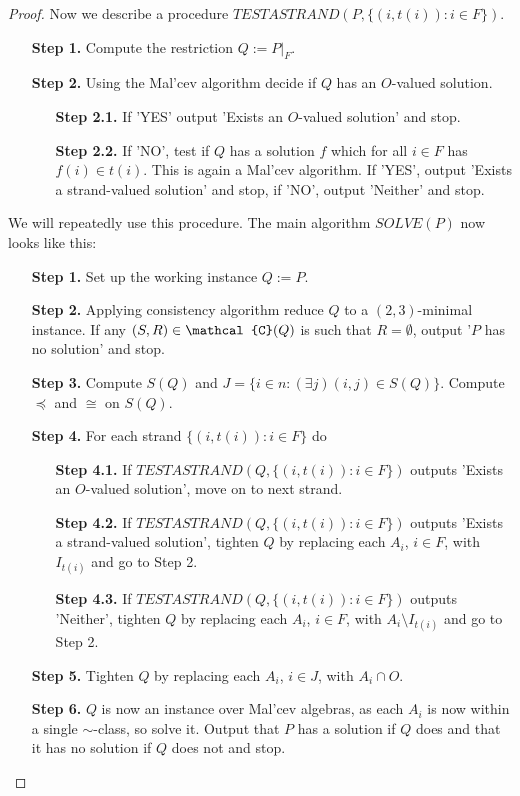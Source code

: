 \documentclass[11pt]{amsart}
\newcommand{\vr}[1]{{\uppercase {\mathcal{#1}}}}
\theoremstyle{definition}
\begin{document}
\begin{proof}
Now we describe a procedure $TESTASTRAND(P,\{(i,t(i)):i\in F\})$.

\begin{enumerate}
\item[{\bf Step 1.}] Compute the restriction $Q:=P|_F$.
\item[{\bf Step 2.}] Using the Mal'cev algorithm decide if $Q$ has an $O$-valued solution.
\begin{enumerate}
\item[{\bf Step 2.1.}] If 'YES' output 'Exists an $O$-valued solution' and stop.
\item[{\bf Step 2.2.}] If 'NO', test if $Q$ has a solution $f$ which for all $i\in F$ has $f(i)\in t(i)$. This is again a Mal'cev algorithm. If 'YES', output 'Exists a strand-valued solution' and stop, if 'NO', output 'Neither' and stop.
\end{enumerate}
\end{enumerate}

We will repeatedly use this procedure. The main algorithm $SOLVE(P)$ now looks like this:

\begin{enumerate}
\item[{\bf Step 1.}] Set up the working instance $Q:=P$.
\item[{\bf Step 2.}] Applying consistency algorithm reduce $Q$ to a $(2,3)$-minimal instance. If any $(S,R)\in\vr c(Q)$ is such that $R=\emptyset$, output '$P$ has no solution' and stop.
\item[{\bf Step 3.}] Compute $S(Q)$ and $J=\{i\in n:(\exists j)(i,j)\in S(Q)\}$. Compute $\preceq$ and $\cong$ on $S(Q)$.
\item[{\bf Step 4.}] For each strand $\{(i,t(i)):i\in F\}$ do
\begin{enumerate}
\item[{\bf Step 4.1.}] If $TESTASTRAND(Q,\{(i,t(i)):i\in F\})$ outputs 'Exists an $O$-valued solution', move on to next strand.
\item[{\bf Step 4.2.}] If  $TESTASTRAND(Q,\{(i,t(i)):i\in F\})$ outputs 'Exists a strand-valued solution', tighten $Q$ by replacing each $A_i$, $i\in F$, with $I_{t(i)}$ and go to Step 2.
\item[{\bf Step 4.3.}] If $TESTASTRAND(Q,\{(i,t(i)):i\in F\})$ outputs 'Neither', tighten $Q$ by replacing each $A_i$, $i\in F$, with  $A_i\setminus I_{t(i)}$ and go to Step 2.
\end{enumerate}
\item[{\bf Step 5.}] Tighten $Q$ by replacing each $A_i$, $i\in J$, with  $A_i\cap O$.
\item[{\bf Step 6.}] $Q$ is now an instance over Mal'cev algebras, as each $A_i$ is now within a single $\sim$-class, so solve it. Output that $P$ has a solution if $Q$ does and that it has no solution if $Q$ does not and stop.
\end{enumerate}


\end{proof}
\end{document}
